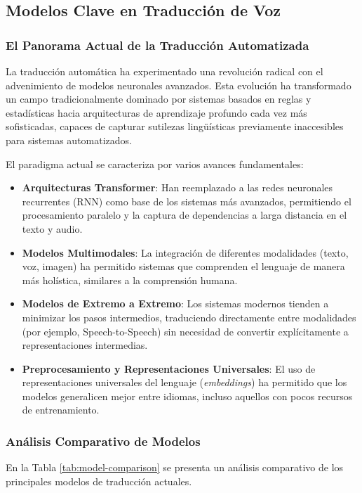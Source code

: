 \subsection{Modelos Clave en Traducción de Voz}

\subsubsection{El Panorama Actual de la Traducción Automatizada}
La traducción automática ha experimentado una revolución radical con el advenimiento de modelos neuronales avanzados. Esta evolución ha transformado un campo tradicionalmente dominado por sistemas basados en reglas y estadísticas hacia arquitecturas de aprendizaje profundo cada vez más sofisticadas, capaces de capturar sutilezas lingüísticas previamente inaccesibles para sistemas automatizados.

El paradigma actual se caracteriza por varios avances fundamentales:

\begin{itemize}
    \item \textbf{Arquitecturas Transformer}: Han reemplazado a las redes neuronales recurrentes (RNN) como base de los sistemas más avanzados, permitiendo el procesamiento paralelo y la captura de dependencias a larga distancia en el texto y audio.
    
    \item \textbf{Modelos Multimodales}: La integración de diferentes modalidades (texto, voz, imagen) ha permitido sistemas que comprenden el lenguaje de manera más holística, similares a la comprensión humana.
    
    \item \textbf{Modelos de Extremo a Extremo}: Los sistemas modernos tienden a minimizar los pasos intermedios, traduciendo directamente entre modalidades (por ejemplo, Speech-to-Speech) sin necesidad de convertir explícitamente a representaciones intermedias.
    
    \item \textbf{Preprocesamiento y Representaciones Universales}: El uso de representaciones universales del lenguaje (\textit{embeddings}) ha permitido que los modelos generalicen mejor entre idiomas, incluso aquellos con pocos recursos de entrenamiento.
\end{itemize}

\subsubsection{Análisis Comparativo de Modelos}
En la Tabla \ref{tab:model-comparison} se presenta un análisis comparativo de los principales modelos de traducción actuales.

